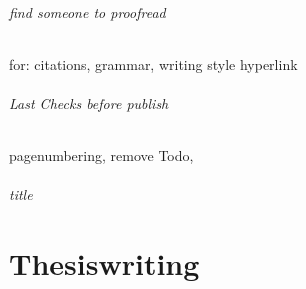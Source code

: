 \paragraph{find someone to proofread}
for:
citations,
grammar,
writing style
hyperlink

\paragraph{Last Checks before publish}
pagenumbering,
remove Todo,

\paragraph{title}


\cleardoublepage
\part{Thesiswriting}
\cleardoublepage